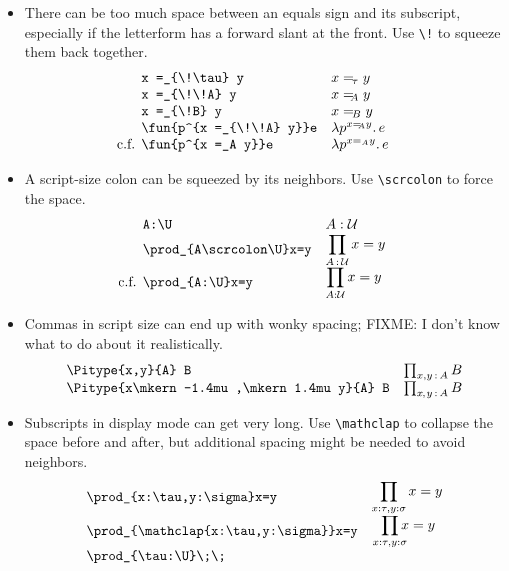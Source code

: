 \documentclass[11pt]{article} %
\makeatletter
\newcommand\ldisplaycell[1]{\begin{array}[c]{@{}l@{}}\displaystyle {#1}\end{array}}
\theoremstyle{definition}
\theoremstyle{remark}
\makeatother
\begin{document}
\begin{itemize}
\item
  There can be too much space between an equals sign and its subscript, especially if the letterform has a forward slant at the front.
  Use \verb/\!/ to squeeze them back together.
  \[\begin{array}{lll}
    \verb/x =_{\!\tau} y/ & x =_{\!\tau} y \\
    \verb/x =_{\!\!A} y/ & x =_{\!\!A} y \\
    \verb/x =_{\!B} y/ & x =_{\!B} y \\
    \verb/\fun{p^{x =_{\!\!A} y}}e/ & \fun{p^{x =_{\!\!A} y}}e \\
    \llap{c.f. }\verb/\fun{p^{x =_A y}}e/ & \fun{p^{x =_A y}}e \\
  \end{array}\]
\item
  A script-size colon can be squeezed by its neighbors.
  Use \verb/\scrcolon/ to force the space.
  \[\begin{array}{lll}
    \verb/A:\U/ & A:\U \\
    \verb/\prod_{A\scrcolon\U}x=y/ & \ldisplaycell{ \prod_{A\scrcolon\U}x=y } \\
    \llap{c.f. }\verb/\prod_{A:\U}x=y/ & \ldisplaycell{ \prod_{A:\U}x=y } \\
  \end{array}\]
\item
  Commas in script size can end up with wonky spacing;
  FIXME: I don't know what to do about it realistically.
  \[\begin{array}{lll}
    \verb/\Pitype{x,y}{A} B/ & \Pitype{x,y}{A} B \\
    \verb/\Pitype{x\mkern -1.4mu ,\mkern 1.4mu y}{A} B/ & \Pitype{x\mkern -1.4mu ,\mkern 1.4mu y}{A} B \\
  \end{array}\]
\item
  Subscripts in display mode can get very long.
  Use \verb/\mathclap/ to collapse the space before and after, but additional spacing might be needed to avoid neighbors.
  \[\begin{array}{lll}
    \verb/\prod_{x:\tau,y:\sigma}x=y/ & \ldisplaycell{ \prod_{x:\tau,y:\sigma}x=y } \\
    \verb/\prod_{\mathclap{x:\tau,y:\sigma}}x=y/ & \ldisplaycell{\;\:\, \prod_{\mathclap{ x:\tau,y:\sigma}}x=y } \\
    \begin{array}[c]{@{}l@{}}
        \verb/\prod_{\tau:\U}\;\;/ \\

\end{array}
\end{array}\]
\end{itemize}
\end{document}
